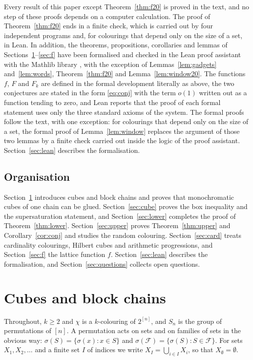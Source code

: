 \documentclass[11pt,reqno]{amsart}
\numberwithin{equation}{section}
\theoremstyle{plain}
\theoremstyle{definition}
\theoremstyle{remark}
\newcommand{\cF}{\mathcal{F}}
\begin{document}
Every result of this paper except Theorem~\ref{thm:f20} is proved in the
text, and no step of these proofs depends on a computer calculation. The
proof of Theorem~\ref{thm:f20} ends in a finite check, which is carried
out by four independent programs and, for colourings that depend only on
the size of a set, in Lean. In addition, the theorems,
propositions, corollaries and lemmas of
Sections~\ref{sec:cubes}--\ref{sec:f} have been formalised and checked in
the Lean proof assistant \cite{MU21} with the Mathlib library
\cite{Mathlib20}, with the exception of Lemmas~\ref{lem:gadgets}
and~\ref{lem:words}, Theorem~\ref{thm:f20} and
Lemma~\ref{lem:window20}. The functions $f$, $F$ and $F_k$ are defined in the
formal development literally as above, the two conjectures are stated in
the form \eqref{eq:conj} with the term $o(1)$ written out as a function
tending to zero, and Lean reports that the proof of each formal statement
uses only the three standard axioms of the system. The formal proofs
follow the text, with one exception: for colourings that depend only on
the size of a set, the formal proof of Lemma~\ref{lem:window} replaces
the argument of those two lemmas by a finite check carried out inside the
logic of the proof assistant. Section~\ref{sec:lean} describes the
formalisation.

\subsection{Organisation}

Section~\ref{sec:cubes} introduces cubes and block chains and proves that
monochromatic cubes of one chain can be glued. Section~\ref{sec:cube}
proves the box inequality and the supersaturation statement, and
Section~\ref{sec:lower} completes the proof of Theorem~\ref{thm:lower}.
Section~\ref{sec:upper} proves Theorem~\ref{thm:upper} and
Corollary~\ref{cor:conj} and studies the random colouring.
Section~\ref{sec:card} treats cardinality colourings, Hilbert cubes and
arithmetic progressions, and Section~\ref{sec:f} the lattice function $f$.
Section~\ref{sec:lean} describes the formalisation, and
Section~\ref{sec:questions} collects open questions.

\section{Cubes and block chains}
\label{sec:cubes}

Throughout, $k\ge2$ and $\chi$ is a $k$-colouring of $2^{[n]}$, and $S_n$
is the group of permutations of $[n]$. A permutation acts on sets and on
families of sets in the obvious way: $\sigma(S)=\{\sigma(x):x\in S\}$ and
$\sigma(\cF)=\{\sigma(S):S\in\cF\}$. For sets $X_1,X_2,\dots$ and a finite
set $I$ of indices we write $X_I=\bigcup_{i\in I}X_i$, so that
$X_\emptyset=\emptyset$.
\end{document}
